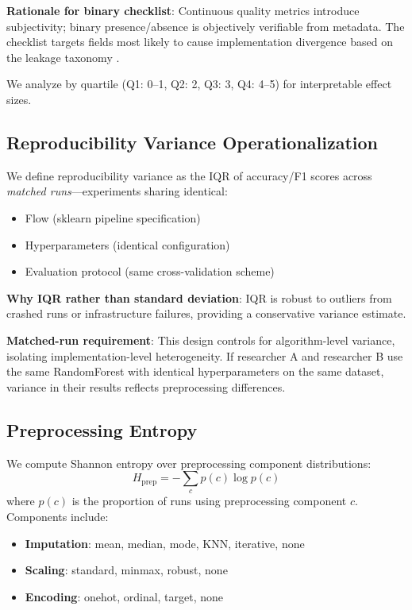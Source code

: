 \textbf{Rationale for binary checklist}: Continuous quality metrics introduce subjectivity; binary presence/absence is objectively verifiable from metadata. The checklist targets fields most likely to cause implementation divergence based on the leakage taxonomy \citep{kapoor2022leakage}.

We analyze by quartile (Q1: 0--1, Q2: 2, Q3: 3, Q4: 4--5) for interpretable effect sizes.

\subsection{Reproducibility Variance Operationalization}

We define reproducibility variance as the IQR of accuracy/F1 scores across \emph{matched runs}---experiments sharing identical:
\begin{itemize}
    \item Flow (sklearn pipeline specification)
    \item Hyperparameters (identical configuration)
    \item Evaluation protocol (same cross-validation scheme)
\end{itemize}

\textbf{Why IQR rather than standard deviation}: IQR is robust to outliers from crashed runs or infrastructure failures, providing a conservative variance estimate.

\textbf{Matched-run requirement}: This design controls for algorithm-level variance, isolating implementation-level heterogeneity. If researcher A and researcher B use the same RandomForest with identical hyperparameters on the same dataset, variance in their results reflects preprocessing differences.

\subsection{Preprocessing Entropy}

We compute Shannon entropy over preprocessing component distributions:
\begin{equation}
H_{\text{prep}} = -\sum_{c} p(c) \log p(c)
\end{equation}
where $p(c)$ is the proportion of runs using preprocessing component $c$. Components include:
\begin{itemize}
    \item \textbf{Imputation}: mean, median, mode, KNN, iterative, none
    \item \textbf{Scaling}: standard, minmax, robust, none
    \item \textbf{Encoding}: onehot, ordinal, target, none
\end{itemize}

